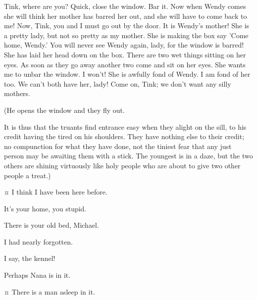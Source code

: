 \begin{drama}
\peterspeaks
Tink, where are you?
Quick, close the window.
Bar it.
Now when Wendy comes she will think her mother has barred her out, and she will have to come back to me!
Now, Tink, you and I must go out by the door.
It is Wendy's mother!
She is a pretty lady, but not so pretty as my mother.
She is making the box say 'Come home, Wendy.'
You will never see Wendy again, lady, for the window is barred!
She has laid her head down on the box.
There are two wet things sitting on her eyes.
As soon as they go away another two come and sit on her eyes.
She wants me to unbar the window.
I won't!
She is awfully fond of Wendy.
I am fond of her too.
We can't both have her, lady!
Come on, Tink; we don't want any silly mothers.

\begin{stagedir}
(He opens the window and they fly out.

It is thus that the truants find entrance easy when they alight on the sill,
\john to his credit having the tired \michael on his shoulders.
They have nothing else to their credit;
no compunction for what they have done, not the tiniest fear that any just person may be awaiting them with a stick.
The youngest is in a daze,
but the two others are shining virtuously like holy people who are about to give two other people a treat.)
\end{stagedir}

\michaelspeaks {}¤
I think I have been here before.

\johnspeaks
It's your home, you stupid.

\wendyspeaks
There is your old bed, Michael.

\michaelspeaks
I had nearly forgotten.

\johnspeaks
I say, the kennel!

\wendyspeaks
Perhaps Nana is in it.

\johnspeaks {}¤
There is a man asleep in it.


\end{drama}
